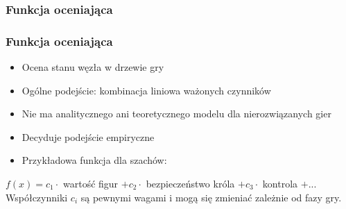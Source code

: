 \documentclass[polish,envcountsect,10pt]{beamer}
\begin{document}
                \subsubsection{Funkcja oceniająca}
                \begin{frame}
                    \frametitle{Funkcja oceniająca}
                    \begin{itemize}
                        \item Ocena stanu węzła w drzewie gry \pause
                        \item Ogólne podejście: kombinacja liniowa ważonych czynników \pause
                        \item Nie ma analitycznego ani teoretycznego modelu dla nierozwiązanych gier\pause
                        \item Decyduje podejście empiryczne \pause
                        \item Przykładowa funkcja dla szachów: \pause
                    \end{itemize}
                    $f(x) = c_1 \cdot$ wartość figur \pause $+ c_2 \cdot$ bezpieczeństwo króla \pause $+ c_3 \cdot$ kontrola \pause $+ ...$ \pause
                    Współczynniki $c_i$ są pewnymi wagami i mogą się zmieniać zależnie od fazy gry.
                \end{frame}
\end{document}

